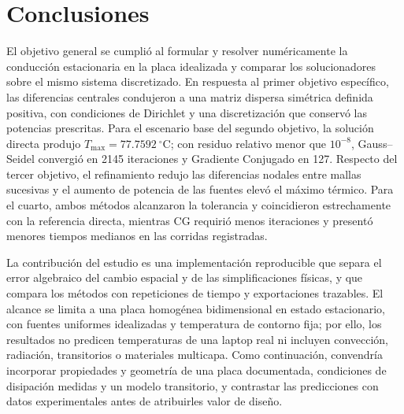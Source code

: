 \section{Conclusiones}

El objetivo general se cumplió al formular y resolver numéricamente la conducción estacionaria en la placa idealizada y comparar los solucionadores sobre el mismo sistema discretizado. En respuesta al primer objetivo específico, las diferencias centrales condujeron a una matriz dispersa simétrica definida positiva, con condiciones de Dirichlet y una discretización que conservó las potencias prescritas. Para el escenario base del segundo objetivo, la solución directa produjo $T_{\max}=77.7592\ ^\circ$C; con residuo relativo menor que $10^{-8}$, Gauss--Seidel convergió en 2145 iteraciones y Gradiente Conjugado en 127. Respecto del tercer objetivo, el refinamiento redujo las diferencias nodales entre mallas sucesivas y el aumento de potencia de las fuentes elevó el máximo térmico. Para el cuarto, ambos métodos alcanzaron la tolerancia y coincidieron estrechamente con la referencia directa, mientras CG requirió menos iteraciones y presentó menores tiempos medianos en las corridas registradas.

La contribución del estudio es una implementación reproducible que separa el error algebraico del cambio espacial y de las simplificaciones físicas, y que compara los métodos con repeticiones de tiempo y exportaciones trazables. El alcance se limita a una placa homogénea bidimensional en estado estacionario, con fuentes uniformes idealizadas y temperatura de contorno fija; por ello, los resultados no predicen temperaturas de una laptop real ni incluyen convección, radiación, transitorios o materiales multicapa. Como continuación, convendría incorporar propiedades y geometría de una placa documentada, condiciones de disipación medidas y un modelo transitorio, y contrastar las predicciones con datos experimentales antes de atribuirles valor de diseño.
